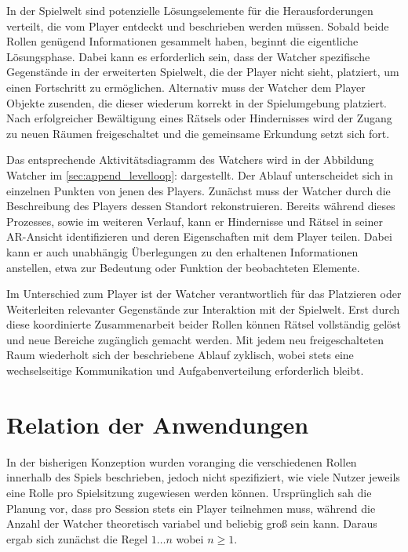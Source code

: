 In der Spielwelt sind potenzielle Lösungselemente für die Herausforderungen verteilt, die vom Player entdeckt und beschrieben werden müssen. Sobald beide Rollen genügend Informationen gesammelt haben, beginnt die eigentliche Lösungsphase. Dabei kann es erforderlich sein, dass der Watcher spezifische Gegenstände in der erweiterten Spielwelt, die der Player nicht sieht, platziert, um einen Fortschritt zu ermöglichen. Alternativ muss der Watcher dem Player Objekte zusenden, die dieser wiederum korrekt in der Spielumgebung platziert. Nach erfolgreicher Bewältigung eines Rätsels oder Hindernisses wird der Zugang zu neuen Räumen freigeschaltet und die gemeinsame Erkundung setzt sich fort.

Das entsprechende Aktivitätsdiagramm des Watchers wird in der Abbildung Watcher im \ref{sec:append_levelloop}:  dargestellt. Der Ablauf unterscheidet sich in einzelnen Punkten von jenen des Players. Zunächst muss der Watcher durch die Beschreibung des Players dessen Standort rekonstruieren. Bereits während dieses Prozesses, sowie im weiteren Verlauf, kann er Hindernisse und Rätsel in seiner \ac{AR}-Ansicht identifizieren und deren Eigenschaften mit dem Player teilen. Dabei kann er auch unabhängig Überlegungen zu den erhaltenen Informationen anstellen, etwa zur Bedeutung oder Funktion der beobachteten Elemente.

Im Unterschied zum Player ist der Watcher verantwortlich für das Platzieren oder Weiterleiten relevanter Gegenstände zur Interaktion mit der Spielwelt. Erst durch diese koordinierte Zusammenarbeit beider Rollen können Rätsel vollständig gelöst und neue Bereiche zugänglich gemacht werden. Mit jedem neu freigeschalteten Raum wiederholt sich der beschriebene Ablauf zyklisch, wobei stets eine wechselseitige Kommunikation und Aufgabenverteilung erforderlich bleibt.


\section{Relation der Anwendungen}

In der bisherigen Konzeption wurden voranging die verschiedenen Rollen innerhalb des Spiels beschrieben, jedoch nicht spezifiziert, wie viele Nutzer jeweils eine Rolle pro Spielsitzung zugewiesen werden können. Ursprünglich sah die Planung vor, dass pro Session stets ein Player teilnehmen muss, während die Anzahl der Watcher theoretisch variabel und beliebig groß sein kann. Daraus ergab sich zunächst die Regel $1\ldots n$ \quad wobei $n \geq 1$.

